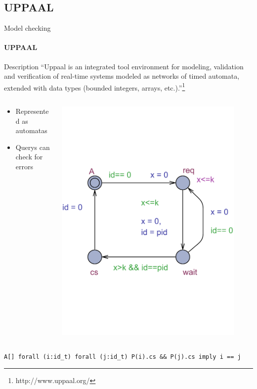 \subsection{UPPAAL}
\begin{frame}[t]{Model checking}
	\framesubtitle{UPPAAL}
	
	\begin{block}{Description}
		\footnotesize 
		``Uppaal is an integrated tool environment for modeling, 
		validation and verification of real-time systems modeled as networks of timed automata, 
		extended with data types (bounded integers, arrays, etc.).''\footnote{http://www.uppaal.org/}
	\end{block}

	\begin{columns}[T]
		\begin{column}{.48\textwidth}
			\begin{itemize}
				\item Represented as automatas
				\item Querys can check for errors
			\end{itemize}
		\end{column}
		\begin{column}{.48\textwidth}
			\includegraphics[trim=0 200 0 200,width=0.90\textwidth]{images/P.pdf}
		\end{column}
	\end{columns}
	\medskip
	\texttt{A[] forall (i:id\_t) forall (j:id\_t) P(i).cs \&\& P(j).cs imply i == j}\end{frame}

